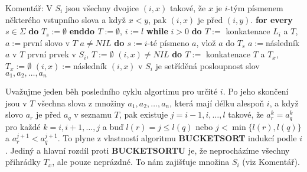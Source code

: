 \documentclass[a4paper,12pt]{article}
\begin{document}
Komentář: V $S_i$ jsou všechny dvojice $(i,x)$ takové, že $
x$ 
je $i$-tým písmenem některého vstupního slova a když $
x<y$, pak 
$(i,x)$ je před $(i,y)$.\newline 
{\bf \textsf{for every}} $s\in\Sigma$ {\bf do} $T_s:=\emptyset$ {\bf enddo\newline 
$T:=\emptyset$}, $i:=l$\newline 
{\bf while} $i>0$ {\bf do\newline 
\phantom{{\rm---}}$T:=$} konkatenace $L_i$ a $T$, $a:=$první slovo v $
T$\newline 
\phantom{---}{\bf while} $a\ne NIL$ {\bf do\newline 
\phantom{{\rm------}}$s:=i$}-té písmeno $a$, vlož $a$ do $
T_s$\newline 
\phantom{------}$a:=$následník $a$ v $T$\newline 
{}první prvek v $S_i$, $T:=\emptyset$\newline 
\phantom{---}{\bf while} $(i,x)\ne NIL$ {\bf do\newline 
\phantom{{\rm------}}$T:=$} konkatenace $T$ a $T_x$, $T_x:=\emptyset$\newline 
\phantom{------}$(i,x):=$následník $(i,x)$ v $S_i$\newline 
{} je setříděná posloupnost slov $a_1,a_2
,\dots,a_n$

Uvažujme jeden běh posledního cyklu algortimu 
pro určité $i$. Po 
jeho skončení jsou v $T$ všechna slova z množiny 
$a_1,a_2,\dots,a_n$, která mají délku alespoň $i$, a když slovo 
$a_r$ je před $a_q$ v seznamu $T$, pak existuje $j=i-1,i,\dots
,l$
takové, že $a^k_r=a^k_q$ pro každé $k=i,i+1,\dots,j$ a buď 
$l(r)=j\le l(q)$ nebo $j<\min\{l(r),l(q)\}$ a $a_r^{j+1}<a_q^{j+1}$. To plyne z 
vlastností algoritmu {\bf BUCKETSORT} indukcí podle $i$. Jediný a 
hlavní rozdíl proti {\bf BUCKETSORTU} je, že neprocházíme 
všechny přihrádky $T_x$, ale pouze neprázdné. 
To nám zajišťuje množina $S_i$ (viz Komentář). 
\end{document}
